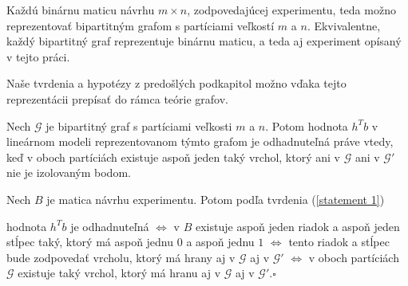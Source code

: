 \begin{center}


\end{center}

Každú binárnu maticu návrhu $m \times n$, zodpovedajúcej experimentu, teda možno reprezentovať bipartitným grafom s partíciami veľkostí $m$ a $n$. 
Ekvivalentne, každý bipartitný graf reprezentuje binárnu maticu, a teda aj experiment opísaný v tejto práci.

Naše tvrdenia a hypotézy z predošlých podkapitol možno vďaka tejto reprezentácii prepísať do rámca teórie grafov.

\begin{prop}
Nech $\mathcal{G}$ je bipartitný graf s partíciami veľkosti $m$ a $n$. 
Potom hodnota $h^T b$ v lineárnom modeli reprezentovanom týmto grafom je odhadnuteľná práve vtedy,
keď v oboch partíciách existuje aspoň jeden taký vrchol, ktorý ani v $\mathcal{G}$ ani v $\mathcal{G}'$ nie je izolovaným bodom.
\end{prop}

\begin{dokaz}
Nech $B$ je matica návrhu experimentu. Potom podľa tvrdenia (\ref{statement 1})

\begin{center}
hodnota $h^T b$ je odhadnuteľná $\Leftrightarrow$ v $B$ existuje aspoň jeden riadok a aspoň jeden stĺpec taký,
ktorý má aspoň jednu $0$ a aspoň jednu $1$ $\Leftrightarrow$ tento riadok a stĺpec bude zodpovedať vrcholu,
ktorý má hrany aj v $\mathcal{G}$ aj v $\mathcal{G}'$ $\Leftrightarrow$ v oboch partíciách $\mathcal{G}$ existuje taký vrchol, ktorý má hranu aj v $\mathcal{G}$ aj v $\mathcal{G}'$.$\square$
\end{center}
\end{dokaz}

